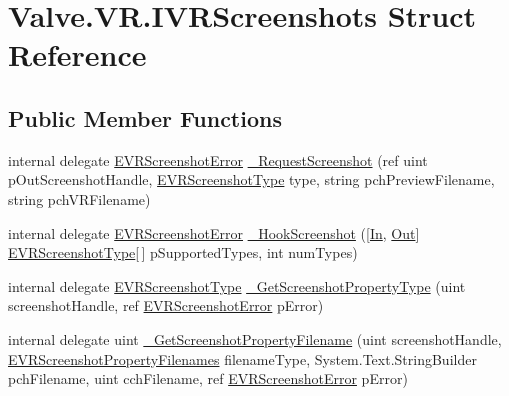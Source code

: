 \hypertarget{struct_valve_1_1_v_r_1_1_i_v_r_screenshots}{}\section{Valve.\+V\+R.\+I\+V\+R\+Screenshots Struct Reference}
\label{struct_valve_1_1_v_r_1_1_i_v_r_screenshots}
\subsection*{Public Member Functions}
\begin{DoxyCompactItemize}
\item 
internal delegate \mbox{\hyperlink{namespace_valve_1_1_v_r_ac73c6dcb1af8fe045a626296a21e226b}{E\+V\+R\+Screenshot\+Error}} \mbox{\hyperlink{struct_valve_1_1_v_r_1_1_i_v_r_screenshots_af21bcc56545f1819ed8b9e255f184fd4}{\+\_\+\+Request\+Screenshot}} (ref uint p\+Out\+Screenshot\+Handle, \mbox{\hyperlink{namespace_valve_1_1_v_r_a033ac579445f0992130b11ba62c9b7ae}{E\+V\+R\+Screenshot\+Type}} type, string pch\+Preview\+Filename, string pch\+V\+R\+Filename)
\item 
internal delegate \mbox{\hyperlink{namespace_valve_1_1_v_r_ac73c6dcb1af8fe045a626296a21e226b}{E\+V\+R\+Screenshot\+Error}} \mbox{\hyperlink{struct_valve_1_1_v_r_1_1_i_v_r_screenshots_ab3be7fe0de54d42becef8b3c699340c3}{\+\_\+\+Hook\+Screenshot}} (\mbox{[}\mbox{\hyperlink{namespace_valve_1_1_v_r_a1e6192cb5ddaf204afab87ccb5728780aefeb369cccbd560588a756610865664c}{In}}, \mbox{\hyperlink{namespace_valve_1_1_v_r_a1e6192cb5ddaf204afab87ccb5728780a7c147cda9e49590f6abe83d118b7353b}{Out}}\mbox{]} \mbox{\hyperlink{namespace_valve_1_1_v_r_a033ac579445f0992130b11ba62c9b7ae}{E\+V\+R\+Screenshot\+Type}}\mbox{[}$\,$\mbox{]} p\+Supported\+Types, int num\+Types)
\item 
internal delegate \mbox{\hyperlink{namespace_valve_1_1_v_r_a033ac579445f0992130b11ba62c9b7ae}{E\+V\+R\+Screenshot\+Type}} \mbox{\hyperlink{struct_valve_1_1_v_r_1_1_i_v_r_screenshots_a2a0f40d54fa11a1803abb2ddca3e3748}{\+\_\+\+Get\+Screenshot\+Property\+Type}} (uint screenshot\+Handle, ref \mbox{\hyperlink{namespace_valve_1_1_v_r_ac73c6dcb1af8fe045a626296a21e226b}{E\+V\+R\+Screenshot\+Error}} p\+Error)
\item 
internal delegate uint \mbox{\hyperlink{struct_valve_1_1_v_r_1_1_i_v_r_screenshots_a9bd7c0035c07384f2e690cfbbf210752}{\+\_\+\+Get\+Screenshot\+Property\+Filename}} (uint screenshot\+Handle, \mbox{\hyperlink{namespace_valve_1_1_v_r_a5a78926aed6b08da8e0e0b8f79911e34}{E\+V\+R\+Screenshot\+Property\+Filenames}} filename\+Type, System.\+Text.\+String\+Builder pch\+Filename, uint cch\+Filename, ref \mbox{\hyperlink{namespace_valve_1_1_v_r_ac73c6dcb1af8fe045a626296a21e226b}{E\+V\+R\+Screenshot\+Error}} p\+Error)

\end{DoxyCompactItemize}
